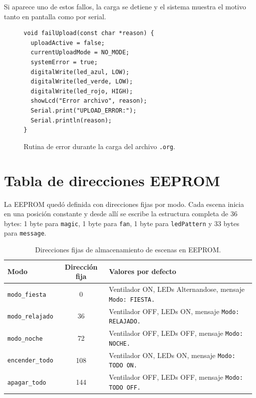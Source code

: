 \documentclass[12pt,a4paper]{article}
\begin{document}
Si aparece uno de estos fallos, la carga se detiene y el sistema muestra el motivo tanto en pantalla como por serial.

\begin{figure}[H]
    \centering
    \begin{minipage}{0.9\textwidth}
        \begin{lstlisting}[basicstyle=\ttfamily\footnotesize]
void failUpload(const char *reason) {
  uploadActive = false;
  currentUploadMode = NO_MODE;
  systemError = true;
  digitalWrite(led_azul, LOW);
  digitalWrite(led_verde, LOW);
  digitalWrite(led_rojo, HIGH);
  showLcd("Error archivo", reason);
  Serial.print("UPLOAD_ERROR:");
  Serial.println(reason);
}
        \end{lstlisting}
    \end{minipage}
    \caption{Rutina de error durante la carga del archivo \texttt{.org}.}
\end{figure}

\section{Tabla de direcciones EEPROM}
La EEPROM quedó definida con direcciones fijas por modo. Cada escena inicia en una posición constante y desde allí se escribe la estructura completa de 36 bytes: 1 byte para \texttt{magic}, 1 byte para \texttt{fan}, 1 byte para \texttt{ledPattern} y 33 bytes para \texttt{message}.

\begin{table}[H]
    \centering
    \caption{Direcciones fijas de almacenamiento de escenas en EEPROM.}
    \small
    \begin{tabular}{p{3.2cm}c p{7.8cm}}
        \toprule
        \textbf{Modo} & \textbf{Dirección fija} & \textbf{Valores por defecto} \\
        \midrule
        \texttt{modo\_fiesta} & 0 & Ventilador ON, LEDs Alternandose, mensaje \texttt{Modo: FIESTA.} \\
        \texttt{modo\_relajado} & 36 & Ventilador OFF, LEDs ON, mensaje \texttt{Modo: RELAJADO.} \\
        \texttt{modo\_noche} & 72 & Ventilador OFF, LEDs OFF, mensaje \texttt{Modo: NOCHE.} \\
        \texttt{encender\_todo} & 108 & Ventilador ON, LEDs ON, mensaje \texttt{Modo: TODO ON.} \\
        \texttt{apagar\_todo} & 144 & Ventilador OFF, LEDs OFF, mensaje \texttt{Modo: TODO OFF.} \\
        \bottomrule
    \end{tabular}
\end{table}
\end{document}
